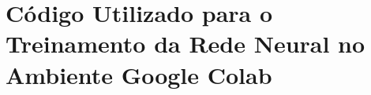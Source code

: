 \chapter{Código Utilizado para o Treinamento da Rede Neural no Ambiente Google Colab} \label{apendice:treinamento}


%
